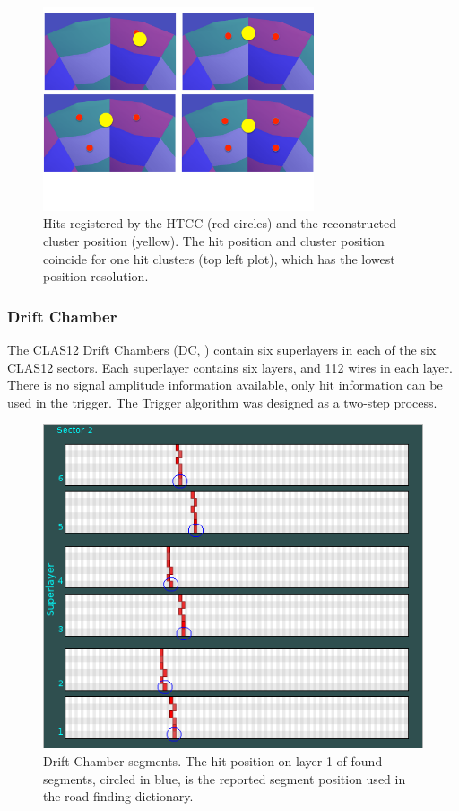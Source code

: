 \begin{figure}[htp]
	\begin{center}
		\centering
		\includegraphics[width=8cm]{img/multiHits.pdf}
		\caption{Hits registered by the HTCC (red circles) and the reconstructed cluster position (yellow). The hit position and cluster position coincide for one hit clusters (top left plot), which has the lowest position resolution.}
		\label{fig:multihitHTCC}
	\end{center}
\end{figure} 


\subsubsection{Drift Chamber}
\label{sec:DC}

The CLAS12 Drift Chambers (DC, \cite{dc-ref}) contain six superlayers in each of the six CLAS12 sectors. Each superlayer contains six layers, and 112 wires in each layer. There is no signal amplitude information available, only hit information can be used in the trigger. The Trigger algorithm was designed as a two-step process.

\begin{figure}[hbt]
	\centering
	\includegraphics[width=1.0\columnwidth,keepaspectratio]{img/dc_segments.png}
	\caption{Drift Chamber segments. The hit position on layer 1 of found segments, circled in blue, is the reported segment position used in the road finding dictionary.}
	\label{fig:dc_segments}
\end{figure}


